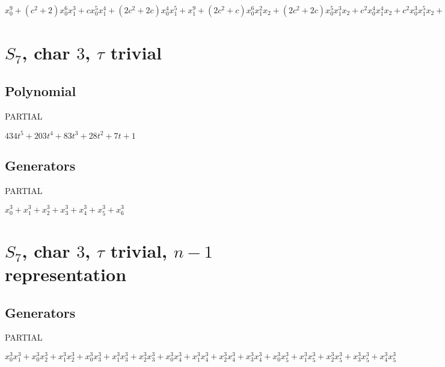 \documentclass{article}
\numberwithin{equation}{section}
\begin{document}
$x_0^9 + (c^2 + 2)x_0^6x_1^3 + cx_0^5x_1^4 + (2c^2 + 2c)x_0^4x_1^5 + x_1^9 + (2c^2 + c)x_0^6x_1^2x_2 + (2c^2 + 2c)x_0^5x_1^3x_2 + c^2x_0^4x_1^4x_2 + c^2x_0^3x_1^5x_2 + (c^2 + 2c)x_0^6x_1x_2^2 + 2c^2x_0^5x_1^2x_2^2 + cx_0^4x_1^3x_2^2 + c^2x_0^3x_1^4x_2^2 + 2c^2x_0^2x_1^5x_2^2 + x_2^9$

\section{$S_7$, char $3$, $\tau$ trivial}

\subsection{Polynomial}

PARTIAL

$434t^5+203t^4+83t^3+28t^2+7t+1$

\subsection{Generators}

PARTIAL

$x_0^3 + x_1^3 + x_2^3 + x_3^3 + x_4^3 + x_5^3 + x_6^3$



       	
\section{$S_7$, char $3$, $\tau$ trivial, $n-1$ representation}

\subsection{Generators} 

PARTIAL


$x_0^3x_1^3 + x_0^3x_2^3 + x_1^3x_2^3 + x_0^3x_3^3 + x_1^3x_3^3 +
x_2^3x_3^3 + x_0^3x_4^3 + x_1^3x_4^3 + x_2^3x_4^3 + x_3^3x_4^3 +
x_0^3x_5^3 + x_1^3x_5^3 + x_2^3x_5^3 + x_3^3x_5^3 + x_4^3x_5^3$
\end{document}
